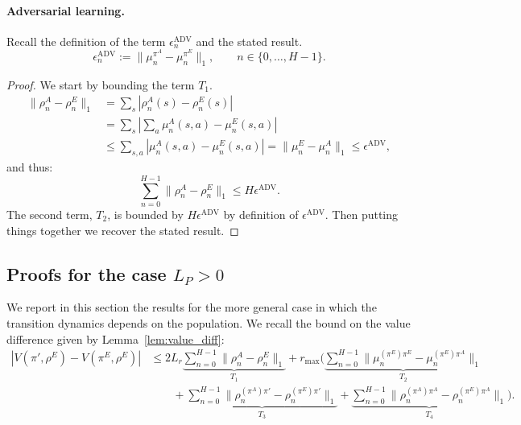 \documentclass{article}
\begin{document}
\paragraph{Adversarial learning.}
Recall the definition of the term $\epsilon_n^\mathrm{ADV}$ and the stated result.
\begin{equation}
    \epsilon_n^\mathrm{ADV} := \|\mu^{\pi^A}_n - \mu^{\pi^E}_n\|_1, \qquad n \in \{0,\dots,H-1\}.
\end{equation}
\popindadv*
\begin{proof}
We start by bounding the term $T_1$. 
\begin{align}
    \|\rho^A_n - \rho^E_n\|_1 &= \sum_{s}|\rho^A_n(s) - \rho^E_n(s)| \\
    &= \sum_{s}|\sum_a \mu^A_n(s,a) - \mu^E_n(s,a)| \\
    &\le \sum_{s,a} |\mu^A_n(s,a) - \mu^E_n(s,a)| = \|\mu_n^E - \mu_n^A\|_1 \le \epsilon^\mathrm{ADV},
\end{align}
and thus: 
\[
    \sum_{n=0}^{H-1} \|\rho^A_n - \rho^E_n\|_1 \leq H \epsilon^\mathrm{ADV}.
\]
The second term, $T_2$, is bounded by $H\epsilon^\mathrm{ADV}$ by definition of $\epsilon^\mathrm{ADV}$.
Then putting things together we recover the stated result.
\end{proof}

\subsection{Proofs for the case $L_P>0$}
We report in this section the results for the more general case in which the transition dynamics depends on the population. We recall the bound on the value difference given by Lemma~\ref{lem:value_diff}:
\begin{align}
    |V(\pi',\rho^E) - V(\pi^E, \rho^E)| &\le 2L_r\underbrace{\sum_{n=0}^{H-1}\|\rho^A_n - \rho^E_n\|_1}_{T_1} + r_{\max}\bigg(\underbrace{\sum_{n=0}^{H-1}\|\mu_n^{(\pi^E)\pi^E}-\mu_n^{(\pi^E)\pi^A}\|_1}_{T_2}  
    \\& 
    \qquad +\underbrace{\sum_{n=0}^{H-1}\|\rho_n^{(\pi^A)\pi'}-\rho_n^{(\pi^E)\pi'}\|_1}_{T_3} + \underbrace{\sum_{n=0}^{H-1}\|\rho_n^{(\pi^A)\pi^A}-\rho_n^{(\pi^E)\pi^A}\|_1}_{T_4}\bigg).
\end{align}
\end{document}
